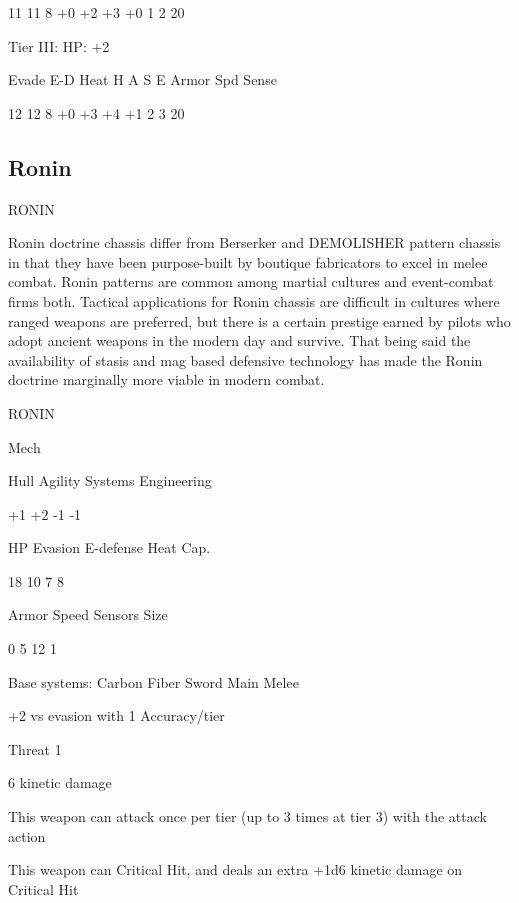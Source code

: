           11        11    8        +0   +2    +3    +0      1            2        20 

Tier III:  
HP: +2
 

          Evade     E-D    Heat    H    A     S     E       Armor        Spd      Sense 

          12        12    8        +0   +3    +4    +1      2            3        20 

                                                                                                                
\subsection{Ronin}

                                                  RONIN  

Ronin doctrine chassis differ from Berserker and DEMOLISHER pattern chassis in that they have  
been purpose-built by boutique fabricators to excel in melee combat. Ronin patterns are  
common among martial cultures and event-combat firms both. Tactical applications for Ronin  
chassis are difficult in cultures where ranged weapons are preferred, but there is a certain  
prestige earned by pilots who adopt ancient weapons in the modern day and survive. That being  
said the availability of stasis and mag based defensive technology has made the Ronin doctrine  
marginally more viable in modern combat. 
 

 RONIN 

 Mech 

 Hull       Agility      Systems       Engineering 

 +1         +2           -1            -1 

 HP         Evasion      E-defense     Heat Cap. 

 18         10           7             8 

 Armor      Speed        Sensors       Size 

 0          5            12            1 

Base systems:  
Carbon Fiber Sword  
Main Melee
 
+2 vs evasion with 1 Accuracy/tier
 
Threat 1
 
6 kinetic damage
 
This weapon can attack once per tier (up to 3 times at tier 3) with the attack action
 
This weapon can Critical Hit, and deals an extra +1d6 kinetic damage on Critical Hit
 

